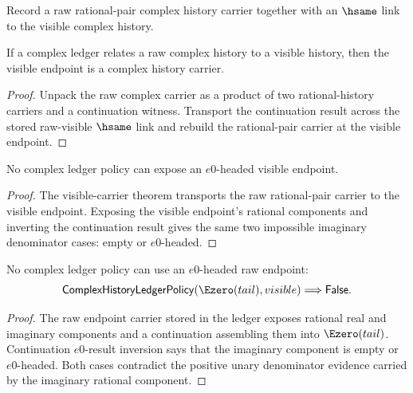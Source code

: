 \begin{definition}
\label{def:complex-ledger-policy}
Record a raw rational-pair complex history carrier together with an \(\hsame\)
link to the visible complex history.
\end{definition}

\begin{theorem}
\label{thm:complex-ledger-visible-carrier}
If a complex ledger relates a raw complex history to a visible history, then
the visible endpoint is a complex history carrier.
\end{theorem}
\begin{proof}
Unpack the raw complex carrier as a product of two rational-history carriers
and a continuation witness. Transport the continuation result across the
stored raw-visible \(\hsame\) link and rebuild the rational-pair carrier at
the visible endpoint.
\end{proof}

\begin{theorem}
\label{thm:complex-ledger-e0-visible-absurd}
No complex ledger policy can expose an \(e0\)-headed visible endpoint.
\end{theorem}
\begin{proof}
The visible-carrier theorem transports the raw rational-pair carrier to the
visible endpoint. Exposing the visible endpoint's rational components and
inverting the continuation result gives the same two impossible imaginary
denominator cases: empty or \(e0\)-headed.
\end{proof}

\begin{theorem}
\label{thm:complex-history-ledger-policy-e0-raw-absurd}
No complex ledger policy can use an \(e0\)-headed raw endpoint:
$$
\mathsf{ComplexHistoryLedgerPolicy}(\Ezero(tail),visible)
\Longrightarrow \mathsf{False}.
$$
\end{theorem}
\begin{proof}
The raw endpoint carrier stored in the ledger exposes rational real and
imaginary components and a continuation assembling them into \(\Ezero(tail)\).
Continuation \(e0\)-result inversion says that the imaginary component is
empty or \(e0\)-headed. Both cases contradict the positive unary denominator
evidence carried by the imaginary rational component.
\end{proof}

